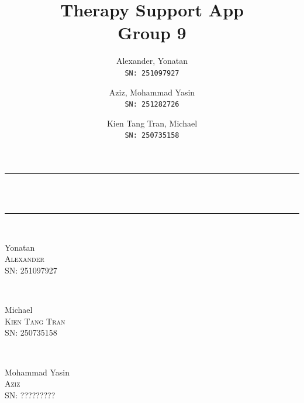 \documentclass[11pt]{article}
\author{Alexander, Yonatan\\
\texttt{SN: 251097927}
\and
Aziz, Mohammad Yasin\\
\texttt{SN: 251282726}
\and
Kien Tang Tran, Michael\\
\texttt{SN: 250735158}
}
\title{Therapy Support App\\
\large Group 9}
\begin{document}
    \begin{titlepage} %
        \newcommand{\HRule}{\rule{\linewidth}{0.5mm}} %

        \center %


        \vspace*{1cm}
        \HRule \\[0.4cm]
        { \huge \bfseries \thetitle }\\[0.4cm] %
        \HRule \\[1.5cm]

        \begin{minipage}{0.3\textwidth}
            \Large
            Yonatan\\
            \textsc{Alexander}\\ %
            SN: 251097927
        \end{minipage}
        ~
        \begin{minipage}{0.3\textwidth}
            \Large
            Michael\\
            \textsc{Kien Tang Tran}\\ %
            SN: 250735158
        \end{minipage}
        ~
        \begin{minipage}{0.3\textwidth}
            \Large
            Mohammad Yasin\\
            \textsc{Aziz}\\ %
            SN: ?????????
        \end{minipage}\\[2cm]



\end{titlepage}
\end{document}
